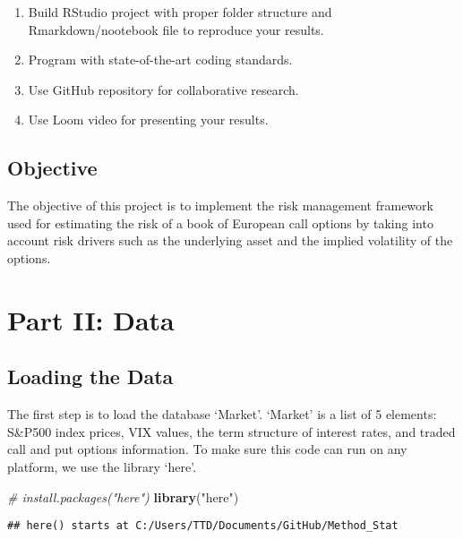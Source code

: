 \documentclass[]{article}
\newenvironment{Shaded}{\begin{snugshade}}{\end{snugshade}}
\newcommand{\CommentTok}[1]{\textcolor[rgb]{0.56,0.35,0.01}{\textit{#1}}}
\newcommand{\KeywordTok}[1]{\textcolor[rgb]{0.13,0.29,0.53}{\textbf{#1}}}
\newcommand{\NormalTok}[1]{#1}
\newcommand{\StringTok}[1]{\textcolor[rgb]{0.31,0.60,0.02}{#1}}
\providecommand{\tightlist}{%
  \setlength{\itemsep}{0pt}\setlength{\parskip}{0pt}}
\begin{document}
\begin{enumerate}
\def\labelenumi{\arabic{enumi}.}
\tightlist
\item
  Build RStudio project with proper folder structure and
  Rmarkdown/nootebook file to reproduce your results.\\
\item
  Program with state-of-the-art coding standards.\\
\item
  Use GitHub repository for collaborative research.\\
\item
  Use Loom video for presenting your results.
\end{enumerate}

\hypertarget{objective}{%
\subsection{Objective}\label{objective}}

The objective of this project is to implement the risk management
framework used for estimating the risk of a book of European call
options by taking into account risk drivers such as the underlying asset
and the implied volatility of the options.

\hypertarget{part-ii-data}{%
\section{Part II: Data}\label{part-ii-data}}

\hypertarget{loading-the-data}{%
\subsection{Loading the Data}\label{loading-the-data}}

The first step is to load the database `Market'. `Market' is a list of 5
elements: S\&P500 index prices, VIX values, the term structure of
interest rates, and traded call and put options information. To make
sure this code can run on any platform, we use the library `here'.

\begin{Shaded}
\begin{Highlighting}[]
\CommentTok{# install.packages("here")}
\KeywordTok{library}\NormalTok{(}\StringTok{"here"}\NormalTok{)}
\end{Highlighting}
\end{Shaded}

\begin{verbatim}
## here() starts at C:/Users/TTD/Documents/GitHub/Method_Stat
\end{verbatim}
\end{document}
